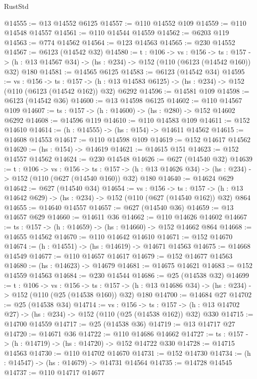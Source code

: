 \begin{lexlean}{RustStd}
\begin{coremodule}
@14555 := @13 @14552 @6125
@14557 := @110 @14552 @109
@14559 := @110 @14548 @14557
@14561 := @110 @14544 @14559
@14562 := @6203 @119
@14563 := @774 @14562
@14564 := @123 @14563
@14565 := @230 @14552
@14567 := @6123 (@14542 @32)
@14580 := {t : @106} ->
  {vs : @156} ->
  {ts : @157} -> (h : @13 @14567 @34) -> (hs : @234) -> @152 (@110 (@6123 (@14542 @160)) @32) @180
@14581 := @14565 @6125
@14583 := @6123 (@14542 @34)
@14595 := {vs : @156} ->
  {ts : @157} ->
  (h : @13 @14583 @6125) -> (hs : @234) -> @152 (@110 (@6123 (@14542 @162)) @32) @6292
@14596 := @14581 @109
@14598 := @6123 (@14542 @36)
@14600 := @13 @14598 @6125
@14602 := @110 @14567 @109
@14607 := {ts : @157} -> (h : @14600) -> (hs : @280) -> @152 @14602 @6292
@14608 := @14596 @119
@14610 := @110 @14583 @109
@14611 := @152 @14610
@14614 := (h : @14555) -> (hs : @154) -> @14611 @14562
@14615 := @14608 @14553
@14617 := @110 @14598 @109
@14619 := @152 @14617 @14562
@14620 := (hs : @154) -> @14619
@14621 := @14615 @151
@14623 := @152 @14557 @14562
@14624 := @230 @14548
@14626 := @627 (@14540 @32)
@14639 := {t : @106} ->
  {vs : @156} ->
  {ts : @157} -> (h : @13 @14626 @34) -> (hs : @234) -> @152 (@110 (@627 (@14540 @160)) @32) @180
@14640 := @14624 @629
@14642 := @627 (@14540 @34)
@14654 := {vs : @156} ->
  {ts : @157} -> (h : @13 @14642 @629) -> (hs : @234) -> @152 (@110 (@627 (@14540 @162)) @32) @864
@14655 := @14640 @14557
@14657 := @627 (@14540 @36)
@14659 := @13 @14657 @629
@14660 := @14611 @36
@14662 := @110 @14626 @14602
@14667 := {ts : @157} -> (h : @14659) -> (hs : @14660) -> @152 @14662 @864
@14668 := @14655 @14562
@14670 := @110 @14642 @14610
@14671 := @152 @14670
@14674 := (h : @14551) -> (hs : @14619) -> @14671 @14563
@14675 := @14668 @14549
@14677 := @110 @14657 @14617
@14679 := @152 @14677 @14563
@14680 := (hs : @14623) -> @14679
@14681 := @14675 @14621
@14683 := @152 @14559 @14563
@14684 := @230 @14544
@14686 := @25 (@14538 @32)
@14699 := {t : @106} ->
  {vs : @156} ->
  {ts : @157} -> (h : @13 @14686 @34) -> (hs : @234) -> @152 (@110 (@25 (@14538 @160)) @32) @180
@14700 := @14684 @27
@14702 := @25 (@14538 @34)
@14714 := {vs : @156} ->
  {ts : @157} -> (h : @13 @14702 @27) -> (hs : @234) -> @152 (@110 (@25 (@14538 @162)) @32) @330
@14715 := @14700 @14559
@14717 := @25 (@14538 @36)
@14719 := @13 @14717 @27
@14720 := @14671 @36
@14722 := @110 @14686 @14662
@14727 := {ts : @157} -> (h : @14719) -> (hs : @14720) -> @152 @14722 @330
@14728 := @14715 @14563
@14730 := @110 @14702 @14670
@14731 := @152 @14730
@14734 := (h : @14547) -> (hs : @14679) -> @14731 @14564
@14735 := @14728 @14545
@14737 := @110 @14717 @14677

\end{coremodule}
\end{lexlean}
